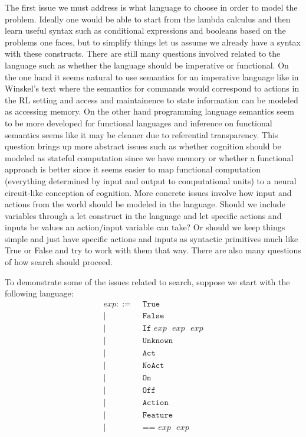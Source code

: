 \documentclass[a4paper,12pt]{article}
\begin{document}
The first issue we must address is what language to choose in order to model the problem.  Ideally one would be able to start from the lambda calculus and then learn useful syntax such as conditional expressions and booleans based on the problems one faces, but to simplify things let us assume we already have a syntax with these constructs.  There are still many questions involved related to the language such as whether the language should be imperative or functional.  On the one hand it seems natural to use semantics for an imperative language like in Winskel's text \cite{Winskel1993Formal} where the semantics for commands would correspond to actions in the RL setting and access and maintainence to state information can be modeled as accessing memory.  On the other hand programming language semantics seem to be more developed for functional languages \cite{Pierce2002Types} and inference on functional semantics seems like it may be cleaner due to referential transparency.  This question brings up more abstract issues such as whether cognition should be modeled as stateful computation since we have memory or whether a functional approach is better since it seems easier to map functional computation (everything determined by input and output to computational units) to a neural circuit-like conception of cognition.  More concrete issues involve how input and actions from the world should be modeled in the language.  Should we include variables through a let construct in the language and let specific actions and inputs be values an action/input variable can take?  Or should we keep things simple and just have specific actions and inputs as syntactic primitives much like True or False and try to work with them that way.  There are also many questions of how search should proceed. 

To demonstrate some of the issues related to search, suppose we start with the following language:
\begin{align*}
exp ::= &\texttt{ True} \\
    |& \texttt{ False} \\
    |& \texttt{ If } exp \texttt{ }exp \texttt{ } exp \\
    |& \texttt{ Unknown }\\
    |& \texttt{ Act }\\
    |& \texttt{ NoAct }\\
    |& \texttt{ On }\\
    |& \texttt{ Off }\\
    |& \texttt{ Action }\\
    |& \texttt{ Feature }\\
    |& \texttt{ == }exp \texttt{ }exp
\end{align*}
\end{document}
